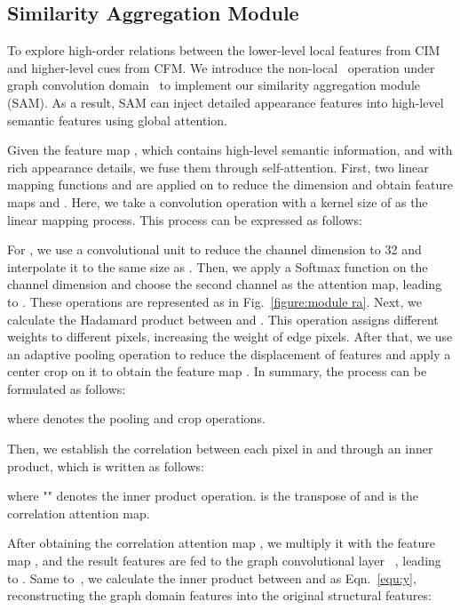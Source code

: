 \documentclass[journal]{IEEEtran}
\begin{document}
\subsection{Similarity Aggregation Module}\label{subsec:GCN}
To explore high-order relations between the lower-level local features from CIM and higher-level cues from CFM. We introduce the non-local~\cite{wang2018non,te2020edge} operation under graph convolution domain~\cite{lu2019graph} to implement our similarity aggregation module (SAM). As a result, SAM can inject detailed appearance features into high-level semantic features using global attention.

Given the feature map , which contains high-level semantic information, and  with rich appearance details, we fuse them through self-attention.
First, two linear mapping functions  and  are applied on  to reduce the dimension and obtain feature maps  and . 
Here, we take a convolution operation with a kernel size of  as the linear mapping process. 
This process can be expressed as follows:



For , we use a convolutional unit  to reduce the channel dimension to 32 and interpolate it to the same size as . 
Then, we apply a Softmax function on the channel dimension and choose the second channel
as the attention map, leading to .
These operations are represented as  in Fig.~\ref{figure:module ra}. 
Next, we calculate the Hadamard product between  and .
This operation assigns different weights to different pixels, increasing the weight of edge pixels.
After that, we use an adaptive pooling operation to reduce the displacement of features and apply a center crop on it to obtain the feature map
.
In summary, the process can be formulated as follows:

where  denotes the pooling and crop operations.

Then, we establish the correlation between each pixel in  and  through an inner product, which is written as follows:

where "" denotes the inner product operation.  is the transpose of  and  is the correlation attention map.

After obtaining the correlation attention map , we multiply it with the feature map , and the result features are fed to the graph convolutional layer~\cite{te2020edge} , leading to . 
Same to~\cite{te2020edge}, we calculate the inner product between  and  as Eqn.~\ref{equ:y}, reconstructing the graph domain features into the original structural features:
\end{document}
